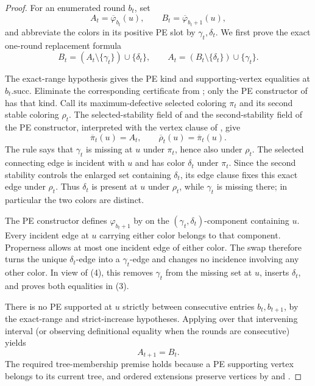 \begin{proof}
For an enumerated round \(b_t\), set
\[
 A_t=\overline\varphi_{b_t}(u),\qquad
 B_t=\overline\varphi_{b_t+1}(u),
\]
and abbreviate the colors in its positive PE slot by
\(\gamma_t,\delta_t\).  We first prove the exact one-round replacement
formula
\[
 B_t=(A_t\setminus\{\gamma_t\})\cup\{\delta_t\},\qquad
 A_t=(B_t\setminus\{\delta_t\})\cup\{\gamma_t\}.               \tag{3}
\]

The exact-range hypothesis gives the PE kind and supporting-vertex
equalities at \(b_t.\mathrm{succ}\).  Eliminate the corresponding
certificate from ; only the PE constructor of
 has that kind.  Call its maximum-defective
selected coloring \(\pi_t\) and its second stable coloring \(\rho_t\).
The selected-stability field of  and the
second-stability field of the PE constructor, interpreted with the
vertex clause of , give
\[
 \overline\pi_t(u)=A_t,
 \qquad \overline\rho_t(u)=\overline\pi_t(u).                  \tag{4}
\]
The rule  says that \(\gamma_t\) is
missing at \(u\) under \(\pi_t\), hence also under \(\rho_t\).
The selected connecting edge is incident with \(u\) and has color
\(\delta_t\) under \(\pi_t\).  Since the second stability controls the
enlarged set containing \(\delta_t\), its edge clause fixes this exact
edge under \(\rho_t\).  Thus \(\delta_t\) is present at \(u\) under
\(\rho_t\), while \(\gamma_t\) is missing there; in particular the two
colors are distinct.

The PE constructor defines \(\varphi_{b_t+1}\) by
 on the
\((\gamma_t,\delta_t)\)-component containing \(u\).  Every incident
edge at \(u\) carrying either color belongs to that component.  Properness
allows at most one incident edge of either color.  The swap therefore
turns the unique \(\delta_t\)-edge into a \(\gamma_t\)-edge and changes
no incidence involving any other color.  In view of (4), this removes
\(\gamma_t\) from the missing set at \(u\), inserts \(\delta_t\), and
proves both equalities in (3).

There is no PE supported at \(u\) strictly between consecutive entries
\(b_t,b_{t+1}\), by the exact-range and strict-increase hypotheses.
Applying  over that intervening
interval (or observing definitional equality when the rounds are
consecutive) yields
\[
 A_{t+1}=B_t.                                                    \tag{5}
\]
The required tree-membership premise holds because a PE supporting
vertex belongs to its current tree, and ordered extensions preserve
vertices by  and
.


\end{proof}

